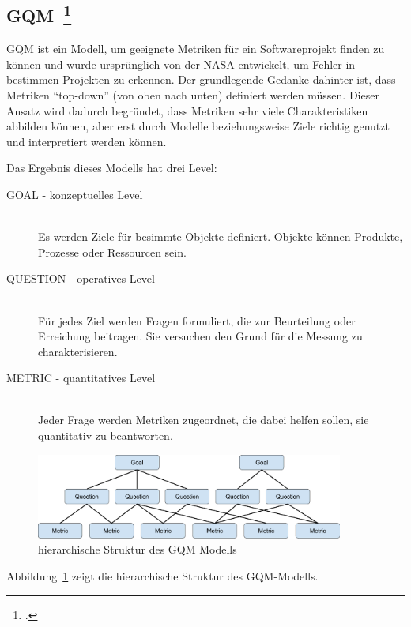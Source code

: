 \subsection[\ac{GQM}]{\ac{GQM}~\footcite[][]{basili_goal_nodate}}

\ac{GQM} ist ein Modell, um geeignete Metriken für ein Softwareprojekt finden zu können und wurde ursprünglich von der \ac{NASA} entwickelt, um Fehler in bestimmen Projekten zu erkennen.
Der grundlegende Gedanke dahinter ist, dass Metriken ``top\mbox{-}down'' (von oben nach unten) definiert werden müssen.
Dieser Ansatz wird dadurch begründet, dass Metriken sehr viele Charakteristiken abbilden können, aber erst durch Modelle beziehungsweise Ziele richtig genutzt und interpretiert werden können.

Das Ergebnis dieses Modells hat drei Level:
\begin{description}
  \item[GOAL \mbox{-} konzeptuelles Level] \hfill \\ Es werden Ziele für besimmte Objekte definiert. Objekte können Produkte, Prozesse oder Ressourcen sein.
  \item[QUESTION \mbox{-} operatives Level] \hfill \\ Für jedes Ziel werden Fragen formuliert, die zur Beurteilung oder Erreichung beitragen. Sie versuchen den Grund für die Messung zu charakterisieren.
  \item[METRIC \mbox{-} quantitatives Level] \hfill \\ Jeder Frage werden Metriken zugeordnet, die dabei helfen sollen, sie quantitativ zu beantworten.
\end{description}

\begin{savenotes}
  \begin{figure}[H] 
    \centering
    \includegraphics[width=0.9\textwidth]{img/gqm.png}
    \caption{hierarchische Struktur des GQM Modells}\label{fig:gqm}
  \end{figure}
\end{savenotes}

Abbildung~\ref{fig:gqm} zeigt die hierarchische Struktur des GQM-Modells.

